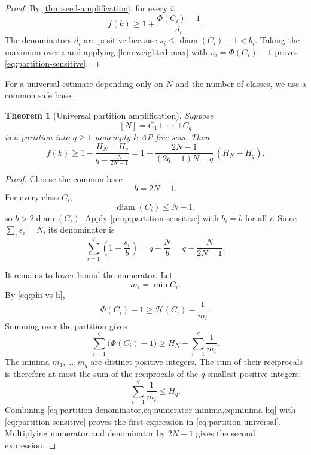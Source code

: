 \documentclass[11pt]{article}
\newtheorem{theorem}{Theorem}[section]
\theoremstyle{definition}
\theoremstyle{remark}
\newcommand{\HH}{\mathcal{H}}
\newcommand{\diam}{\operatorname{diam}}
\begin{document}
\begin{proof}
By \cref{thm:seed-amplification}, for every $i$,
\[
 f(k)\ge 1+\frac{\Phi(C_i)-1}{d_i}.
\]
The denominators $d_i$ are positive because
$s_i\le\diam(C_i)+1<b_i$.  Taking the maximum over $i$ and applying
\cref{lem:weighted-max} with $u_i=\Phi(C_i)-1$ proves
\cref{eq:partition-sensitive}.
\end{proof}

For a universal estimate depending only on $N$ and the number of classes,
we use a common safe base.

\begin{theorem}[Universal partition amplification]\label{thm:partition-universal}
Suppose
\[
 [N]=C_1\sqcup\cdots\sqcup C_q
\]
is a partition into $q\ge 1$ nonempty $k$-AP-free sets.  Then
\begin{equation}\label{eq:partition-universal}
 f(k)\ge
 1+\frac{H_N-H_q}{\displaystyle q-\frac{N}{2N-1}}
 =
 1+\frac{2N-1}{(2q-1)N-q}\,(H_N-H_q).
\end{equation}
\end{theorem}

\begin{proof}
Choose the common base
\[
 b=2N-1.
\]
For every class $C_i$,
\[
 \diam(C_i)\le N-1,
\]
so $b>2\diam(C_i)$.  Apply \cref{prop:partition-sensitive} with
$b_i=b$ for all $i$.  Since $\sum_i s_i=N$, its denominator is
\begin{equation}\label{eq:partition-denominator}
 \sum_{i=1}^q\left(1-\frac{s_i}{b}\right)
 =q-\frac{N}{b}
 =q-\frac{N}{2N-1}.
\end{equation}

It remains to lower-bound the numerator.  Let
\[
 m_i=\min C_i.
\]
By \cref{eq:phi-vs-h},
\[
 \Phi(C_i)-1
 \ge
 \HH(C_i)-\frac1{m_i}.
\]
Summing over the partition gives
\begin{equation}\label{eq:numerator-minima}
 \sum_{i=1}^q\bigl(\Phi(C_i)-1\bigr)
 \ge
 H_N-\sum_{i=1}^q\frac1{m_i}.
\end{equation}
The minima $m_1,\ldots,m_q$ are distinct positive integers.  The sum of
their reciprocals is therefore at most the sum of the reciprocals of the
$q$ smallest positive integers:
\begin{equation}\label{eq:minima-hq}
 \sum_{i=1}^q\frac1{m_i}\le H_q.
\end{equation}
Combining \cref{eq:partition-denominator,eq:numerator-minima,eq:minima-hq}
with \cref{eq:partition-sensitive} proves the first expression in
\cref{eq:partition-universal}.  Multiplying numerator and denominator by
$2N-1$ gives the second expression.
\end{proof}
\end{document}
